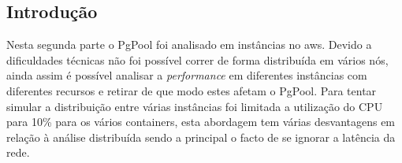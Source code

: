 \subsection{Introdução}
Nesta segunda parte o PgPool foi analisado em instâncias no aws. Devido a dificuldades técnicas não foi possível correr de forma distribuída em vários nós, ainda assim é possível analisar a \textit{performance} em diferentes instâncias com diferentes recursos e retirar de que modo estes afetam o PgPool. Para tentar simular a distribuição entre várias instâncias foi limitada a utilização do CPU para 10\% para os vários containers, esta abordagem tem várias desvantagens em relação à análise distribuída sendo a principal o facto de se ignorar a latência da rede.